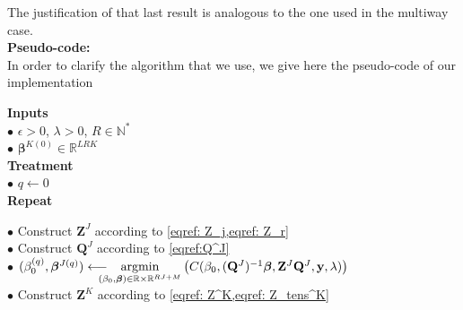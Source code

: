 \documentclass[preprint,12pt]{elsarticle}
\begin{document}
\noindent The justification of that last result is analogous to the one used in the multiway case.\\[2 pt]

{\fontsize{12}{8}\selectfont \noindent \textbf{Pseudo-code:}}\\[1 pt]
In order to clarify the algorithm that we use, we give here the pseudo-code of our implementation\\[5 pt]

\begin{mdframed}[leftmargin=0cm, rightmargin=3.2cm]
    \noindent \textbf{Inputs}\\
    \phantom{a}\hspace{5 pt} $\bullet$ $\epsilon >0$, $\lambda >0$, $R \in \mathbb{N}^{*}$\\[2 pt]
    \phantom{a}\hspace{5 pt} $\bullet$ $\bm{\beta}^{K(0)} \in \mathbb{R}^{LRK}$\\[4 pt]
    \textbf{Treatment}\\
    \phantom{a}\hspace{5 pt} $\bullet$ $q \leftarrow 0$\\[2 pt]
    \phantom{a}\hspace{5 pt}  \textbf{Repeat}\\[2 pt]
    \phantom{a}\hspace{22 pt} $\bullet$ Construct $\mathbf{Z}^J$ according to \cref{eqref: Z_j,eqref: Z_r}\\[2 pt]
    \phantom{a}\hspace{25 pt} $\bullet$ Construct $\mathbf{Q}^J$ according to \cref{eqref:Q^J}\\[2 pt]
    \phantom{a}\hspace{25 pt}  $\bullet$ $(\beta_0^{(q)}, \bm{\beta}^{J {(q)}}) \longleftarrow \hspace{-10 pt} \underset{(\beta_0, \bm{\beta}) \in \mathbb{R} \times \mathbb{R}^{RJ + M}}{\text{argmin}} \left( C(\beta_0, (\mathbf{Q}^J)^{-1}\bm{\beta},\mathbf{Z}^J \mathbf{Q}^J, \mathbf{y}, \lambda) \right)$\\[2 pt]
    \phantom{a}\hspace{25 pt} $\bullet$ Construct $\mathbf{Z}^K$ according to \cref{eqref: Z^K,eqref: Z_tens^K}\\[3 pt]

\end{mdframed}
\end{document}
